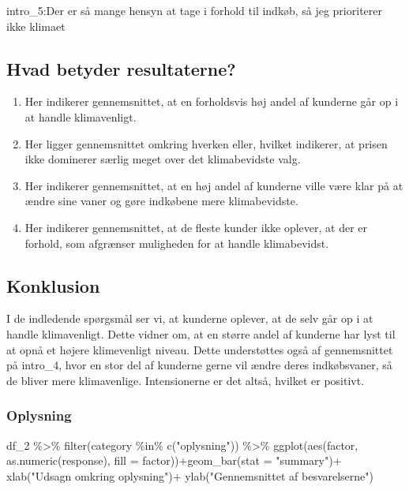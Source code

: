 \documentclass[
]{article}
\newenvironment{Shaded}{\begin{snugshade}}{\end{snugshade}}
\newcommand{\AttributeTok}[1]{\textcolor[rgb]{0.77,0.63,0.00}{#1}}
\newcommand{\FunctionTok}[1]{\textcolor[rgb]{0.00,0.00,0.00}{#1}}
\newcommand{\NormalTok}[1]{#1}
\newcommand{\SpecialCharTok}[1]{\textcolor[rgb]{0.00,0.00,0.00}{#1}}
\newcommand{\StringTok}[1]{\textcolor[rgb]{0.31,0.60,0.02}{#1}}
\begin{document}
intro\_5:Der er så mange hensyn at tage i forhold til indkøb, så jeg
prioriterer ikke klimaet

\hypertarget{hvad-betyder-resultaterne}{%
\subsection{Hvad betyder
resultaterne?}\label{hvad-betyder-resultaterne}}

\begin{enumerate}
\def\labelenumi{\arabic{enumi}.}
\setcounter{enumi}{1}
\item
  Her indikerer gennemsnittet, at en forholdsvis høj andel af kunderne
  går op i at handle klimavenligt.
\item
  Her ligger gennemsnittet omkring hverken eller, hvilket indikerer, at
  prisen ikke dominerer særlig meget over det klimabevidste valg.
\item
  Her indikerer gennemsnittet, at en høj andel af kunderne ville være
  klar på at ændre sine vaner og gøre indkøbene mere klimabevidste.
\item
  Her indikerer gennemsnittet, at de fleste kunder ikke oplever, at der
  er forhold, som afgrænser muligheden for at handle klimabevidst.
\end{enumerate}

\hypertarget{konklusion}{%
\subsection{Konklusion}\label{konklusion}}

I de indledende spørgsmål ser vi, at kunderne oplever, at de selv går op
i at handle klimavenligt. Dette vidner om, at en større andel af
kunderne har lyst til at opnå et højere klimevenligt niveau. Dette
understøttes også af gennemsnittet på intro\_4, hvor en stor del af
kunderne gerne vil ændre deres indkøbsvaner, så de bliver mere
klimavenlige. Intensionerne er det altså, hvilket er positivt.

\hypertarget{oplysning}{%
\subsubsection{Oplysning}\label{oplysning}}

\begin{Shaded}
\begin{Highlighting}[]
\NormalTok{df\_2 }\SpecialCharTok{\%\textgreater{}\%} 
  \FunctionTok{filter}\NormalTok{(category }\SpecialCharTok{\%in\%} \FunctionTok{c}\NormalTok{(}\StringTok{"oplysning"}\NormalTok{)) }\SpecialCharTok{\%\textgreater{}\%} 
  \FunctionTok{ggplot}\NormalTok{(}\FunctionTok{aes}\NormalTok{(factor, }\FunctionTok{as.numeric}\NormalTok{(response), }\AttributeTok{fill =}\NormalTok{ factor))}\SpecialCharTok{+}\FunctionTok{geom\_bar}\NormalTok{(}\AttributeTok{stat =} \StringTok{"summary"}\NormalTok{)}\SpecialCharTok{+} 
  \FunctionTok{xlab}\NormalTok{(}\StringTok{"Udsagn omkring oplysning"}\NormalTok{)}\SpecialCharTok{+} \FunctionTok{ylab}\NormalTok{(}\StringTok{"Gennemsnittet af besvarelserne"}\NormalTok{)}
\end{Highlighting}
\end{Shaded}
\end{document}
